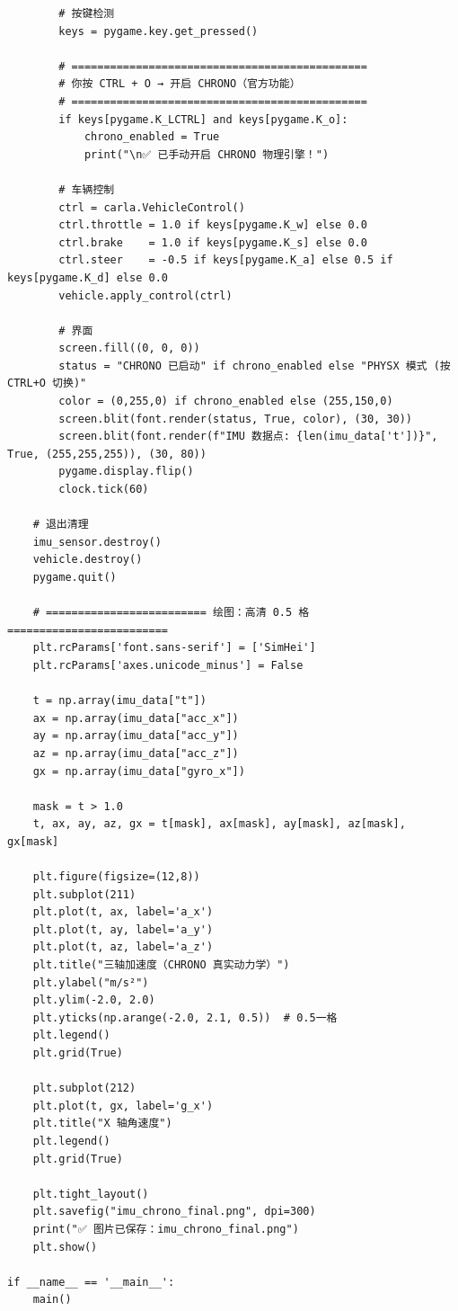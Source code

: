 \begin{lstlisting}
        # 按键检测
        keys = pygame.key.get_pressed()

        # ==============================================
        # 你按 CTRL + O → 开启 CHRONO（官方功能）
        # ==============================================
        if keys[pygame.K_LCTRL] and keys[pygame.K_o]:
            chrono_enabled = True
            print("\n✅ 已手动开启 CHRONO 物理引擎！")

        # 车辆控制
        ctrl = carla.VehicleControl()
        ctrl.throttle = 1.0 if keys[pygame.K_w] else 0.0
        ctrl.brake    = 1.0 if keys[pygame.K_s] else 0.0
        ctrl.steer    = -0.5 if keys[pygame.K_a] else 0.5 if keys[pygame.K_d] else 0.0
        vehicle.apply_control(ctrl)

        # 界面
        screen.fill((0, 0, 0))
        status = "CHRONO 已启动" if chrono_enabled else "PHYSX 模式 (按 CTRL+O 切换)"
        color = (0,255,0) if chrono_enabled else (255,150,0)
        screen.blit(font.render(status, True, color), (30, 30))
        screen.blit(font.render(f"IMU 数据点: {len(imu_data['t'])}", True, (255,255,255)), (30, 80))
        pygame.display.flip()
        clock.tick(60)

    # 退出清理
    imu_sensor.destroy()
    vehicle.destroy()
    pygame.quit()

    # ========================= 绘图：高清 0.5 格 =========================
    plt.rcParams['font.sans-serif'] = ['SimHei']
    plt.rcParams['axes.unicode_minus'] = False

    t = np.array(imu_data["t"])
    ax = np.array(imu_data["acc_x"])
    ay = np.array(imu_data["acc_y"])
    az = np.array(imu_data["acc_z"])
    gx = np.array(imu_data["gyro_x"])

    mask = t > 1.0
    t, ax, ay, az, gx = t[mask], ax[mask], ay[mask], az[mask], gx[mask]

    plt.figure(figsize=(12,8))
    plt.subplot(211)
    plt.plot(t, ax, label='a_x')
    plt.plot(t, ay, label='a_y')
    plt.plot(t, az, label='a_z')
    plt.title("三轴加速度（CHRONO 真实动力学）")
    plt.ylabel("m/s²")
    plt.ylim(-2.0, 2.0)
    plt.yticks(np.arange(-2.0, 2.1, 0.5))  # 0.5一格
    plt.legend()
    plt.grid(True)

    plt.subplot(212)
    plt.plot(t, gx, label='g_x')
    plt.title("X 轴角速度")
    plt.legend()
    plt.grid(True)

    plt.tight_layout()
    plt.savefig("imu_chrono_final.png", dpi=300)
    print("✅ 图片已保存：imu_chrono_final.png")
    plt.show()

if __name__ == '__main__':
    main()
\end{lstlisting}

